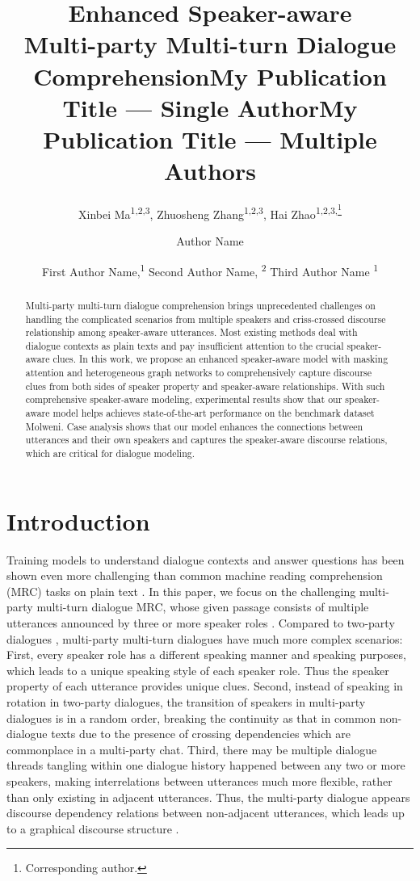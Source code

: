 \documentclass[letterpaper]{article} \usepackage{stylefile}  \usepackage{times}  \usepackage{helvet}  \usepackage{courier}  \usepackage[hyphens]{url}  \usepackage{graphicx} \urlstyle{rm} \def\UrlFont{\rm}  \usepackage{natbib}  \usepackage{caption} \DeclareCaptionStyle{ruled}{labelfont=normalfont,labelsep=colon,strut=off} \frenchspacing  \setlength{\pdfpagewidth}{8.5in}  \setlength{\pdfpageheight}{11in}  \usepackage{algorithm}
\title{Enhanced Speaker-aware \\Multi-party Multi-turn Dialogue Comprehension}
\author{
    Xinbei Ma\textsuperscript{\rm 1,2,3},
    Zhuosheng Zhang\textsuperscript{\rm 1,2,3},
	Hai Zhao\textsuperscript{\rm 1,2,3,\thanks{Corresponding author.}}\\
}
\title{My Publication Title --- Single Author}
\author {
    Author Name
}
\title{My Publication Title --- Multiple Authors}
\author {
First Author Name,\textsuperscript{\rm 1}
    Second Author Name, \textsuperscript{\rm 2}
    Third Author Name \textsuperscript{\rm 1}
}
\begin{document}
\maketitle

\begin{abstract}
Multi-party multi-turn dialogue comprehension brings unprecedented challenges on handling the complicated scenarios from multiple speakers and criss-crossed discourse relationship among speaker-aware utterances. 
Most existing methods deal with dialogue contexts as plain texts and pay insufficient attention to the crucial speaker-aware clues.
In this work, we propose an enhanced speaker-aware model with masking attention and heterogeneous graph networks to comprehensively capture discourse clues from both sides of speaker property and speaker-aware relationships.
With such comprehensive speaker-aware modeling, experimental results show that our speaker-aware model helps achieves state-of-the-art performance on the benchmark dataset Molweni.  Case analysis shows that our model enhances the connections between utterances and their own speakers and captures the speaker-aware discourse relations, which are critical for dialogue modeling.
\end{abstract}

\section{Introduction}

Training models to understand dialogue contexts and answer questions has been shown even more challenging than common machine reading comprehension (MRC) tasks on plain text \cite{reddy2019coqa,choi2018quac}. In this paper, we focus on the challenging multi-party multi-turn dialogue MRC, whose given passage consists of multiple utterances announced by three or more speaker roles \cite{li2020molweni}. Compared to two-party dialogues \cite{Loweubuntu,Wudouban,Zhangedc}, multi-party multi-turn dialogues have much more complex scenarios: First, every speaker role has a different speaking manner and speaking purposes, which leads to a unique speaking style of each speaker role. Thus the speaker property of each utterance provides unique clues\cite{liumdfn,Gusabert}. Second, instead of speaking in rotation in two-party dialogues, the transition of speakers in multi-party dialogues is in a random order, breaking the continuity as that in common non-dialogue texts due to the presence of crossing dependencies which are commonplace in a multi-party chat. Third, there may be multiple dialogue threads tangling within one dialogue history happened between any two or more speakers, making interrelations between utterances much more flexible, rather than only existing in adjacent utterances. Thus, the multi-party dialogue appears discourse dependency relations between non-adjacent utterances, which leads up to a graphical discourse structure \cite{shi2019deep,li2020molweni}.
\end{document}
